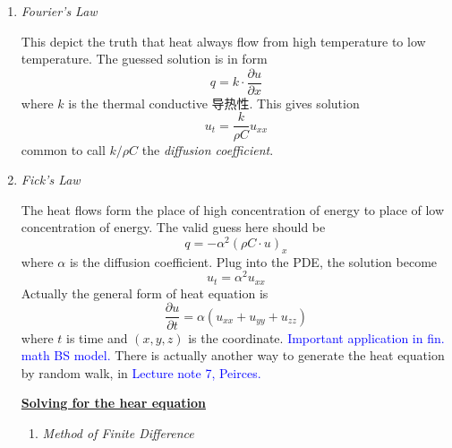 \documentclass[10pt]{article}
\newenvironment{changemargin}[2]{%
  \begin{list}{}{%
    \setlength{\topsep}{0pt}%
    \setlength{\leftmargin}{#1}%
    \setlength{\rightmargin}{#2}%
    \setlength{\listparindent}{\parindent}%
    \setlength{\itemindent}{\parindent}%
    \setlength{\parsep}{\parskip}%
  }%
  \item[]}{\end{list}}
\begin{document}
\begin{changemargin}{-0.125in}{0in}
\begin{enumerate}
\begin{enumerate}
\begin{enumerate}
	                \medskip
	                
	                
	                \item  \textit{Fourier's Law}
	                
	                \smallskip
	                
	                This depict the truth that heat always flow from high temperature to low temperature.  The guessed solution is in form 
	                \[
	                q = k \cdot \frac{\partial u}{\partial x}
	                \]
	                where $k$ is the thermal conductive 导热性. This gives solution 
	                \[
	                u_t = \frac{k}{\rho C} u_{xx}
	                \]
	                common to call $k/\rho C$ the \textit{diffusion coefficient}.
	                
	                \smallskip
	                
	                \item \textit{Fick's Law}
	                
	                \smallskip
	                
	                The heat flows form the place of high concentration of energy to place of low concentration of energy. The valid guess here should be 
	                \[
	                q = -\alpha^2 (\rho C \cdot u)_x
	                \]
	                 where $\alpha$ is the diffusion coefficient. Plug into the PDE, the solution become 
	                 \[
	                 u_t = \alpha^2 u_{xx}
	                 \]
	                 Actually the general form of heat equation is 
	                 \[
	                 \frac{\partial u}{\partial t} = \alpha(u_{xx} + u_{yy} + u_{zz})
	                 \]
	                 where $t$ is time and $(x,y,z)$ is the coordinate. \textcolor{blue}{Important application in fin. math BS model.} There is actually another way to generate the heat equation by random walk, in \textcolor{blue}{Lecture note 7, Peirces.}
	                 
	                 
	                 
	                 \medskip
	                 
  	                 \underline{\textbf{Solving for the hear equation}}
  	                 
  	                 \smallskip
  	                 
  	                 
  	                 \begin{enumerate}
  	                 	\item \textit{Method of Finite Difference}
  	                 	

\end{enumerate}
\end{enumerate}
\end{enumerate}
\end{enumerate}
\end{changemargin}
\end{document}
